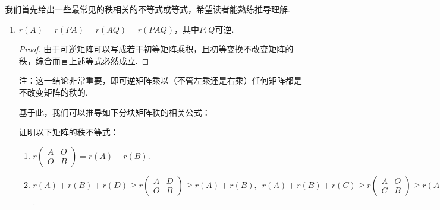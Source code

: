 我们首先给出一些最常见的秩相关的不等式或等式，希望读者能熟练推导理解.
\begin{enumerate}
    \item $r(A)=r(PA)=r(AQ)=r(PAQ)$，其中$P,Q$可逆.

          \begin{proof}
              由于可逆矩阵可以写成若干初等矩阵乘积，且初等变换不改变矩阵的秩，综合而言上述等式必然成立.
          \end{proof}

          注：这一结论非常重要，即可逆矩阵乘以（不管左乘还是右乘）任何矩阵都是不改变矩阵的秩的.

    基于此，我们可以推导如下分块矩阵秩的相关公式：

    \begin{example}\label{ex:11:分块秩不等式}
        证明以下矩阵的秩不等式：
        \begin{enumerate}
            \item $r\begin{pmatrix}
                        A & O \\ O & B
                    \end{pmatrix}=r(A)+r(B)$.

            \item $r(A)+r(B)+r(D)\geqslant r\begin{pmatrix}
                        A & D \\ O & B
                    \end{pmatrix}\geqslant r(A)+r(B),\enspace r(A)+r(B)+r(C)\geqslant r\begin{pmatrix}
                        A & O \\ C & B
                    \end{pmatrix}\geqslant r(A)+r(B)$.
        \end{enumerate}
    \end{example}


\end{enumerate}
